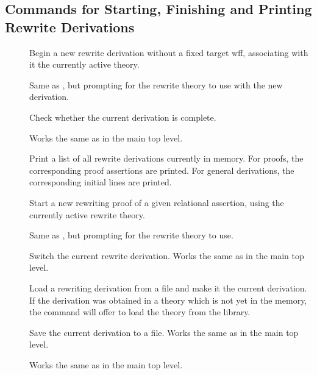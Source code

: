 \subsection{Commands for Starting, Finishing and Printing Rewrite Derivations}
  \begin{description}
  \item[]  Begin a new rewrite derivation without a fixed
    target wff, associating with it the currently active theory.
  \item[]  Same as , but prompting
    for the rewrite theory to use with the new derivation.
  \item[]  Check whether the current derivation is complete.
  \item[]  Works the same as in the main top level.
  \item[]  Print a list of all rewrite derivations
    currently in memory. For proofs, the corresponding proof assertions are
    printed. For general derivations, the corresponding initial lines are
    printed.
  \item[]  Start a new rewriting proof of a given
    relational assertion, using the currently active rewrite theory.
  \item[]  Same as , but prompting
    for the rewrite theory to use.
  \item[]  Switch the current rewrite derivation.
    Works the same as in the main top level.
  \item[]  Load a rewriting derivation from a file
    and make it the current derivation. If the derivation was obtained in a
    theory which is not yet in the memory, the command will offer to load the
    theory from the library.
  \item[]  Save the current derivation to a file.
    Works the same as in the main top level.
  \item[]  Works the same as in the main top level.
  \end{description}

